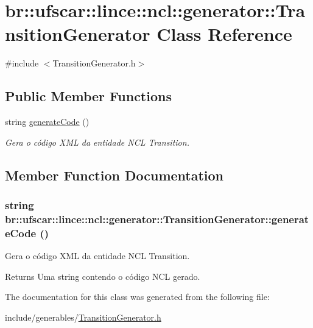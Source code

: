 \hypertarget{classbr_1_1ufscar_1_1lince_1_1ncl_1_1generator_1_1TransitionGenerator}{
\section{br::ufscar::lince::ncl::generator::TransitionGenerator Class Reference}
\label{classbr_1_1ufscar_1_1lince_1_1ncl_1_1generator_1_1TransitionGenerator}
}


{\ttfamily \#include $<$TransitionGenerator.h$>$}

\subsection*{Public Member Functions}
\begin{DoxyCompactItemize}
\item 
string \hyperlink{classbr_1_1ufscar_1_1lince_1_1ncl_1_1generator_1_1TransitionGenerator_adb91fd9814b4a547e20f3020866f004b}{generateCode} ()
\begin{DoxyCompactList}\small\item\em Gera o código XML da entidade NCL Transition. \item\end{DoxyCompactList}\end{DoxyCompactItemize}


\subsection{Member Function Documentation}
\hypertarget{classbr_1_1ufscar_1_1lince_1_1ncl_1_1generator_1_1TransitionGenerator_adb91fd9814b4a547e20f3020866f004b}{
\subsubsection[{generateCode}]{\setlength{\rightskip}{0pt plus 5cm}string br::ufscar::lince::ncl::generator::TransitionGenerator::generateCode ()}}
\label{classbr_1_1ufscar_1_1lince_1_1ncl_1_1generator_1_1TransitionGenerator_adb91fd9814b4a547e20f3020866f004b}


Gera o código XML da entidade NCL Transition. 

\begin{DoxyReturn}{Returns}
Uma string contendo o código NCL gerado. 
\end{DoxyReturn}


The documentation for this class was generated from the following file:\begin{DoxyCompactItemize}
\item 
include/generables/\hyperlink{TransitionGenerator_8h}{TransitionGenerator.h}\end{DoxyCompactItemize}
